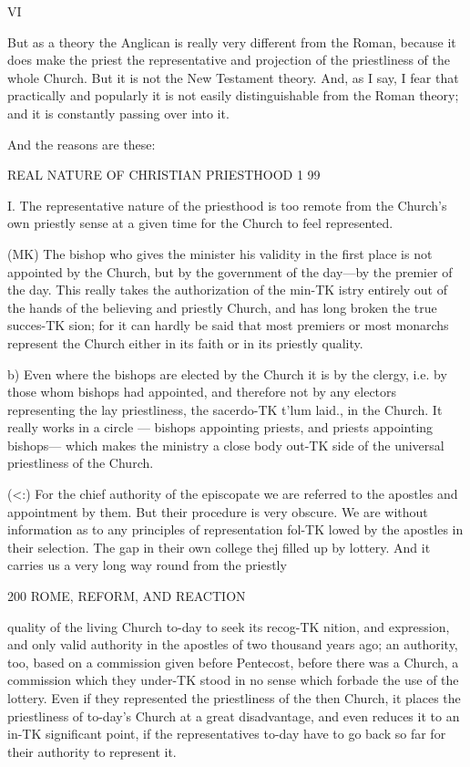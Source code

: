 \documentclass[12pt,a5paper,oneside]{book}
\begin{document}
{VI 

But as a theory the Anglican is really very different 
from the Roman, because it does make the priest the 
representative and projection of the priestliness of the 
whole Church. But it is not the New Testament 
theory. And, as I say, I fear that practically and 
popularly it is not easily distinguishable from the 
Roman theory; and it is constantly passing over into it. 

And the reasons are these: 



REAL NATURE OF CHRISTIAN PRIESTHOOD 1 99 

I. The representative nature of the priesthood is 
too remote from the Church's own priestly sense at a 
given time for the Church to feel represented. 

(MK) The bishop who gives the minister his validity 
in the first place is not appointed by the Church, but 
by the government of the day---by the premier of the 
day. This really takes the authorization of the min-TK
istry entirely out of the hands of the believing and 
priestly Church, and has long broken the true succes-TK
sion; for it can hardly be said that most premiers or 
most monarchs represent the Church either in its faith 
or in its priestly quality. 

{b) Even where the bishops are elected by the 
Church it is by the clergy, i.e. by those whom 
bishops had appointed, and therefore not by any 
electors representing the lay priestliness, the sacerdo-TK
t'lum laid., in the Church. It really works in a circle 
— bishops appointing priests, and priests appointing 
bishops— which makes the ministry a close body out-TK
side of the universal priestliness of the Church. 

(<:) For the chief authority of the episcopate we are 
referred to the apostles and appointment by them. 
But their procedure is very obscure. We are without 
information as to any principles of representation fol-TK
lowed by the apostles in their selection. The gap in 
their own college thej filled up by lottery. And it 
carries us a very long way round from the priestly 



200 ROME, REFORM, AND REACTION 

quality of the living Church to-day to seek its recog-TK
nition, and expression, and only valid authority in the 
apostles of two thousand years ago; an authority, too, 
based on a commission given before Pentecost, before 
there was a Church, a commission which they under-TK
stood in no sense which forbade the use of the lottery. 
Even if they represented the priestliness of the then 
Church, it places the priestliness of to-day's Church at 
a great disadvantage, and even reduces it to an in-TK
significant point, if the representatives to-day have to 
go back so far for their authority to represent it. 

}}
\end{document}
